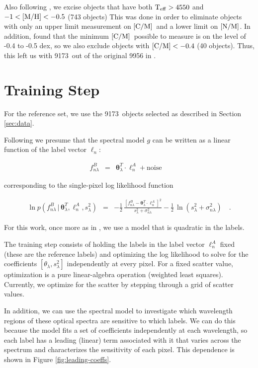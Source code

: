 \documentclass[12pt, preprint]{aastex}
\newcommand{\set}[1]{\bm{#1}}
\newcommand{\teff}{\mbox{$\rm T_{eff}$}}
\newcommand{\mh}{\mbox{$\rm [M/H]$}}
\newcommand{\cm}{\mbox{$\rm [C/M]$}}
\newcommand{\nm}{\mbox{$\rm [N/M]$}}
\newcommand{\starlabel}{\ell}
\newcommand{\starlabelvec}{\set{\starlabel}}
\newcommand{\given}{\,|\,}
\newcommand{\ntrobj}{9173}
\begin{document}
Also following \citet{Martig2016}, we excise objects that have both
$\teff > 4550$ and $-1 < \mh < -0.5$ (743 objects)
This was done in order to eliminate objects with only
an upper limit measurement on \cm\ and a lower limit on \nm.
In addition, \citet{Martig2016} found that the minimum \cm\ possible
to measure is on the level of -0.4 to -0.5 dex, so we also exclude
objects with $\cm < -0.4$ (40 objects).
Thus, this left us with \ntrobj\ out of the original 9956 in
\citet{Ho2016}.


\section{Training Step}
\label{sec:training}

For the reference set, we use the 
\ntrobj\ objects selected as described in Section \ref{sec:data}.

Following \citet{Ness2015} we presume that the spectral model $g$ 
can be written as a linear function of the label vector $\starlabelvec_n$: 

\begin{eqnarray}
f_{n\lambda}^B &=&
\set{\theta}_\lambda^T \cdot \starlabelvec^A_n + \mbox{noise}
\label{eq:linearmodel}\quad
\end{eqnarray}

\noindent corresponding to the single-pixel log likelihood function

\begin{eqnarray}
\ln p(f_{n\lambda}^B\given\set{\theta}^T_\lambda, \starlabelvec^A_n, s_\lambda^2) &=&
 -\frac{1}{2}\,\frac{[f_{n\lambda}^B - \set{\theta}^T_\lambda \cdot \starlabelvec^A_n]^2}{s_\lambda^2 + \sigma_{n\lambda}^2}
 -\frac{1}{2}\,\ln(s_\lambda^2 + \sigma_{n\lambda}^2)
\label{eq:like}\quad.
\end{eqnarray}

\noindent For this work, once more as in \citet{Ness2015}, 
we use a model that is quadratic in the labels. 

The training step consists of holding the labels in the label vector 
$\starlabelvec^A_n$ fixed (these are the reference labels) 
and optimizing the log likelihood to solve for the coefficients 
$[\theta_\lambda, s_\lambda^2]$ independently at every pixel. 
For a fixed scatter value, optimization is a pure linear-algebra operation 
(weighted least squares). 
Currently, we optimize for the scatter by stepping through a 
grid of scatter values.

In addition, we can use the spectral model to investigate
which wavelength regions of these optical spectra
are sensitive to which labels. We can do this because
the model fits a set of coefficients independently
at each wavelength, so each label has a leading (linear)
term associated with it that varies across the spectrum
and characterizes the sensitivity of each pixel. 
This dependence is shown in Figure \ref{fig:leading-coeffs}.
\end{document}
